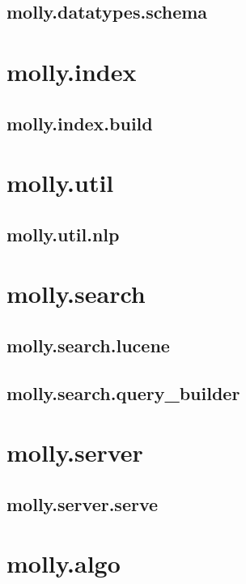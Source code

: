 			\clearpage
			\subsection{molly.datatypes.schema}
		
		\clearpage
		\section{molly.index}
			\subsection{molly.index.build}
		
		\clearpage
		\section{molly.util}
			\subsection{molly.util.nlp}
		
		\clearpage
		\section{molly.search}
			\subsection{molly.search.lucene}
		
			\clearpage
			\subsection{molly.search.query\_builder}
		
		\clearpage
		\section{molly.server}
			\subsection{molly.server.serve}
		
		\clearpage
		\section{molly.algo}
